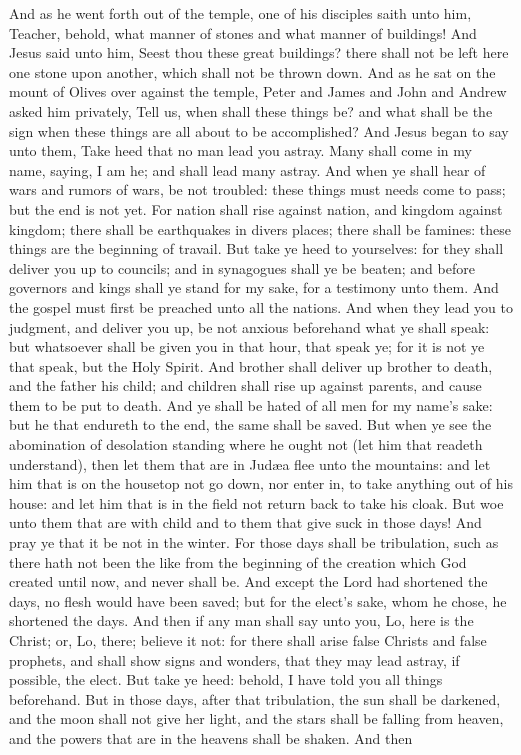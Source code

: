 And as he went forth out of the temple, one of his disciples saith unto him, Teacher, behold, what manner of stones and what manner of buildings! And Jesus said unto him, Seest thou these great buildings? there shall not be left here one stone upon another, which shall not be thrown down.  And as he sat on the mount of Olives over against the temple, Peter and James and John and Andrew asked him privately, Tell us, when shall these things be? and what shall be the sign when these things are all about to be accomplished? And Jesus began to say unto them, Take heed that no man lead you astray. Many shall come in my name, saying, I am he; and shall lead many astray. And when ye shall hear of wars and rumors of wars, be not troubled: these things must needs come to pass; but the end is not yet. For nation shall rise against nation, and kingdom against kingdom; there shall be earthquakes in divers places; there shall be famines: these things are the beginning of travail.  But take ye heed to yourselves: for they shall deliver you up to councils; and in synagogues shall ye be beaten; and before governors and kings shall ye stand for my sake, for a testimony unto them. And the gospel must first be preached unto all the nations. And when they lead you to judgment, and deliver you up, be not anxious beforehand what ye shall speak: but whatsoever shall be given you in that hour, that speak ye; for it is not ye that speak, but the Holy Spirit. And brother shall deliver up brother to death, and the father his child; and children shall rise up against parents, and cause them to be put to death. And ye shall be hated of all men for my name’s sake: but he that endureth to the end, the same shall be saved.  But when ye see the abomination of desolation standing where he ought not (let him that readeth understand), then let them that are in Judæa flee unto the mountains: and let him that is on the housetop not go down, nor enter in, to take anything out of his house: and let him that is in the field not return back to take his cloak. But woe unto them that are with child and to them that give suck in those days! And pray ye that it be not in the winter. For those days shall be tribulation, such as there hath not been the like from the beginning of the creation which God created until now, and never shall be. And except the Lord had shortened the days, no flesh would have been saved; but for the elect’s sake, whom he chose, he shortened the days. And then if any man shall say unto you, Lo, here is the Christ; or, Lo, there; believe it not: for there shall arise false Christs and false prophets, and shall show signs and wonders, that they may lead astray, if possible, the elect. But take ye heed: behold, I have told you all things beforehand.  But in those days, after that tribulation, the sun shall be darkened, and the moon shall not give her light, and the stars shall be falling from heaven, and the powers that are in the heavens shall be shaken. And then 